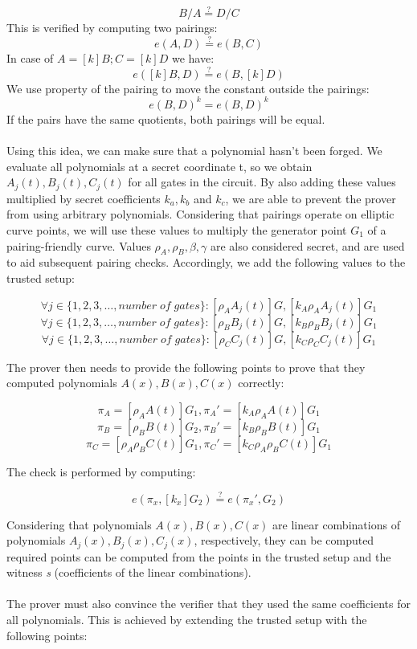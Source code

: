 $$ B / A \stackrel{?}{=} D / C $$
This is verified by computing two pairings:
$$ e(A, D) \stackrel{?}{=} e(B, C) $$
In case of $A = [k]B; C = [k]D$ we have:
$$ e([k]B, D) \stackrel{?}{=} e(B, [k]D)$$
We use property of the pairing to move the constant outside the pairings:
$$ e(B, D)^k = e(B, D)^k $$
If the pairs have the same quotients, both pairings will be equal.\\
\\
Using this idea, we can make sure that a polynomial hasn't been forged. We evaluate all polynomials at a secret coordinate t, so we obtain $A_j(t), B_j(t), C_j(t)$ for all gates in the circuit. By also adding these values multiplied by secret coefficients $k_a, k_b$ and $k_c$, we are able to prevent the prover from using arbitrary polynomials. Considering that pairings operate on elliptic curve points, we will use these values to multiply the generator point $G_1$ of a pairing-friendly curve. Values $\rho_A, \rho_B, \beta, \gamma$ are also considered secret, and are used to aid subsequent pairing checks. Accordingly, we add the following values to the trusted setup:

$$\forall j \in \{1, 2, 3, \ldots, number\;of\;gates\} : [\rho_A A_j(t)]G, [k_A \rho_A A_j(t)]G_1 $$
$$\forall j \in \{1, 2, 3, \ldots, number\;of\;gates\} : [\rho_B B_j(t)]G, [k_B \rho_B B_j(t)]G_1 $$ 
$$\forall j \in \{1, 2, 3, \ldots, number\;of\;gates\} : [\rho_C C_j(t)]G, [k_C \rho_C C_j(t)]G_1 $$ 

The prover then needs to provide the following points to prove that they computed polynomials $A(x), B(x), C(x)$ correctly:

$$\pi_A = [\rho_A A(t)]G_1, \pi_A' = [k_A \rho_A A(t)]G_1$$
$$\pi_B = [\rho_B B(t)]G_2, \pi_B' = [k_B \rho_B B(t)]G_1$$
$$\pi_C = [\rho_A \rho_B C(t)]G_1, \pi_C' = [k_C \rho_A \rho_B C(t)]G_1$$

The check is performed by computing:

$$ e(\pi_x, [k_x]G_2) \stackrel{?}{=} e(\pi_x', G_2) $$

Considering that polynomials $A(x), B(x), C(x)$ are linear combinations of polynomials $A_j(x), B_j(x), C_j(x)$, respectively, they can be computed required points can be computed from the points in the trusted setup and the witness \textit{s} (coefficients of the linear combinations).\\
\\
The prover must also convince the verifier that they used the same coefficients for all polynomials. This is achieved by extending the trusted setup with the following points:

